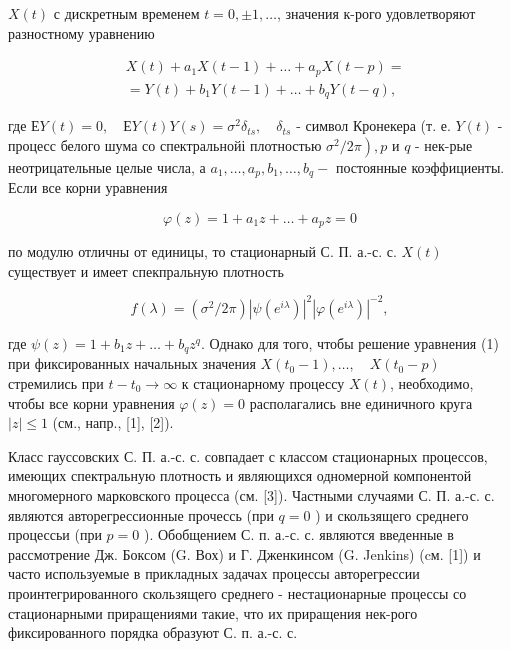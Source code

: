 \documentclass[10pt]{article}
\begin{document}
$X(t)$ с дискретным временем $t=0, \pm 1, \ldots$, значения к-рого удовлетворяют разностному уравнению



\[

\begin{aligned}

& X(t)+a_{1} X(t-1)+\ldots+a_{p} X(t-p)= \\

& =Y(t)+b_{1} Y(t-1)+\ldots+b_{q} Y(t-q),

\end{aligned}

\]



где $Е Y(t)=0, \quad Е Y(t) Y(s)=\sigma^{2} \delta_{t s}, \quad \delta_{t s}$ - символ Кронекера (т. е. $Y(t)$ - процесс белого шума со спектральнойі плотностью $\left.\sigma^{2} / 2 \pi\right), p$ и $q$ - нек-рые неотрицательные целые числа, а $a_{1}, \ldots, a_{p}, b_{1}, \ldots, b_{q}-$ постоянные коэффициенты. Если все корни уравнения



\[

\varphi(z)=1+a_{1} z+\ldots+a_{p} z=0

\]



по модулю отличны от единицы, то стационарный С. П. а.-с. с. $X(t)$ существует и имеет спекпральную плотность



\[

f(\lambda)=\left(\sigma^{2} / 2 \pi\right)\left|\psi\left(e^{i \lambda}\right)\right|^{2}\left|\varphi\left(e^{i \lambda}\right)\right|^{-2},

\]



где $\psi(z)=1+b_{1} z+\ldots+b_{q} z^{q}$. Однако для того, чтобы решение уравнения (1) при фиксированных начальных значения $X\left(t_{0}-1\right), \ldots, \quad X\left(t_{0}-p\right)$ стремились при $t-t_{0} \rightarrow \infty$ к стационарному процессу $X(t)$, необходимо, чтобы все корни уравнения $\varphi(z)=0$ располагались вне единичного круга $|z| \leqslant 1$ (см., напр., [1], [2]).



Класс гауссовских С. П. а.-с. с. совпадает с классом стационарных процессов, имеющих спектральную плотность и являющихся одномерной компонентой многомерного марковского процесса (см. [3]). Частными случаями С. П. а.-с. с. являются авторегрессионные прочессь (при $q=0$ ) и скользящего среднего процессьи (при $p=0$ ). Обобщением С. п. а.-с. с. являются введенные в рассмотрение Дж. Боксом (G. Вох) и Г. Дженкинсом (G. Jenkins) (cм. [1]) и часто используемые в прикладных задачах процессы авторегрессии проинтегрированного скользящего среднего - нестационарные процессы со стационарными приращениями такие, что их приращения нек-рого фиксированного порядка образуют С. п. а.-с. с.
\end{document}
